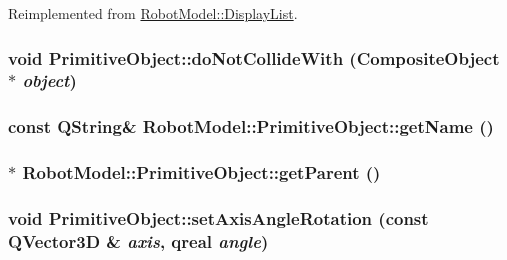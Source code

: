 Reimplemented from \hyperlink{class_robot_model_1_1_display_list_a023ba88eaac38b26dc9ea6a358467637}{RobotModel::DisplayList}.\hypertarget{class_robot_model_1_1_primitive_object_a8fc60e9e4a29b895d45871d842081605}{
\subsubsection[{doNotCollideWith}]{\setlength{\rightskip}{0pt plus 5cm}void PrimitiveObject::doNotCollideWith ({\bf CompositeObject} $\ast$ {\em object})}}
\label{class_robot_model_1_1_primitive_object_a8fc60e9e4a29b895d45871d842081605}
\hypertarget{class_robot_model_1_1_primitive_object_a2bad14bd18e70f3e95b6ebfca7014d2e}{
\subsubsection[{getName}]{\setlength{\rightskip}{0pt plus 5cm}const QString\& RobotModel::PrimitiveObject::getName ()}}
\label{class_robot_model_1_1_primitive_object_a2bad14bd18e70f3e95b6ebfca7014d2e}
\hypertarget{class_robot_model_1_1_primitive_object_a6981588496b77d1942435296631d1ef0}{
\subsubsection[{getParent}]{$\ast$ RobotModel::PrimitiveObject::getParent ()}}
\label{class_robot_model_1_1_primitive_object_a6981588496b77d1942435296631d1ef0}
\hypertarget{class_robot_model_1_1_primitive_object_a3ae3782ae64f5fc07f4d18646e04ed21}{
\subsubsection[{setAxisAngleRotation}]{\setlength{\rightskip}{0pt plus 5cm}void PrimitiveObject::setAxisAngleRotation (const QVector3D \& {\em axis}, \/  qreal {\em angle})}}
\label{class_robot_model_1_1_primitive_object_a3ae3782ae64f5fc07f4d18646e04ed21}


